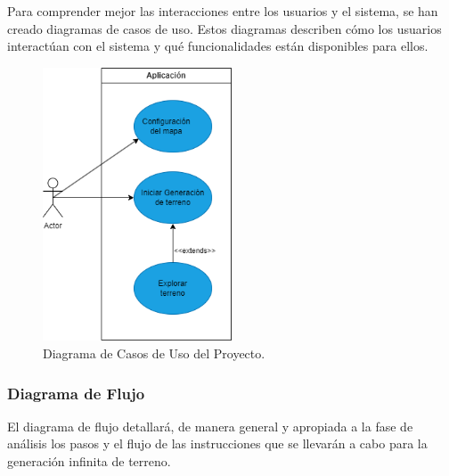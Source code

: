 Para comprender mejor las interacciones entre los usuarios y el sistema, se han creado diagramas de casos de uso. Estos diagramas describen cómo los usuarios interactúan con el sistema y qué funcionalidades están disponibles para ellos.

\begin{figure}[H]
    \centering
    \includegraphics[width=0.5\textwidth]{img/UseCases.png}
    \caption{Diagrama de Casos de Uso del Proyecto.}
\end{figure}

\newpage
\subsubsection{Diagrama de Flujo}

El diagrama de flujo detallará, de manera general y apropiada a la fase de análisis los pasos y el flujo de las instrucciones que se llevarán a cabo para la generación infinita de terreno.

